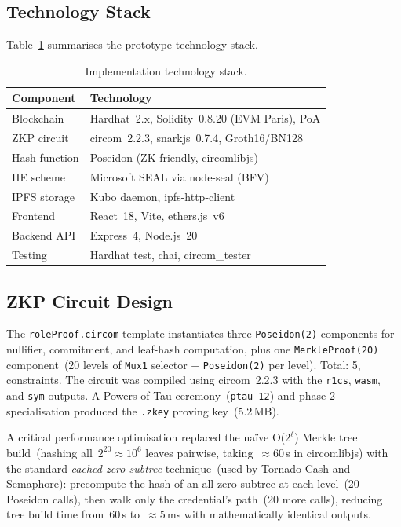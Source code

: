 \documentclass[10pt,twocolumn,a4paper]{article}
\begin{document}
\subsection{Technology Stack}

Table~\ref{tab:stack} summarises the prototype technology stack.

\begin{table}[!t]
\centering
\caption{Implementation technology stack.}
\label{tab:stack}
\renewcommand{\arraystretch}{1.15}
\scriptsize
\setlength{\tabcolsep}{4pt}
\begin{tabularx}{\columnwidth}{>{\raggedright\arraybackslash}p{2.0cm} X}
\toprule
\textbf{Component} & \textbf{Technology} \\
\midrule
Blockchain    & Hardhat~2.x, Solidity~0.8.20 (EVM Paris), PoA \\
ZKP circuit   & circom~2.2.3, snarkjs~0.7.4, Groth16/BN128 \\
Hash function & Poseidon (ZK-friendly, circomlibjs) \\
HE scheme     & Microsoft SEAL via node-seal (BFV) \\
IPFS storage  & Kubo daemon, ipfs-http-client \\
Frontend      & React~18, Vite, ethers.js~v6 \\
Backend API   & Express~4, Node.js~20 \\
Testing       & Hardhat test, chai, circom\_tester \\
\bottomrule
\end{tabularx}
\end{table}

\subsection{ZKP Circuit Design}

The \texttt{roleProof.circom} template instantiates three \texttt{Poseidon(2)} components
for nullifier, commitment, and leaf-hash computation, plus one \texttt{MerkleProof(20)}
component~(20 levels of \texttt{Mux1} selector + \texttt{Poseidon(2)} per level).
Total: 5, constraints. The circuit was compiled using circom~2.2.3
with the \texttt{r1cs}, \texttt{wasm}, and \texttt{sym} outputs.
A Powers-of-Tau ceremony~(\texttt{ptau~12}) and phase-2 specialisation produced
the \texttt{.zkey} proving key~(5.2\,MB).

A critical performance optimisation replaced the naïve O($2^\ell$) Merkle tree
build~(hashing all~$2^{20} \approx 10^6$ leaves pairwise, taking~$\approx\!60$\,s in
circomlibjs) with the standard \emph{cached-zero-subtree} technique~(used by Tornado
Cash and Semaphore): precompute the hash of an all-zero subtree at each level~(20
Poseidon calls), then walk only the credential's path~(20 more calls), reducing tree
build time from~60\,s to~$\approx\!5$\,ms with mathematically identical outputs.
\end{document}
